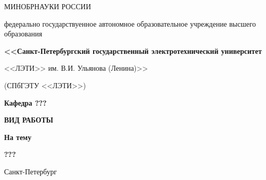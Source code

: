 \documentclass[../main.tex]{subfiles}
\begin{document}
\begin{titlepage}
    \centering

    МИНОБРНАУКИ РОССИИ

    федерально государствуенное автономное образовательное учреждение высшего образования

    {\bfseries\small
        <<Санкт-Петербургский государственный электротехнический университет

        <<ЛЭТИ>> им. В.И. Ульянова (Ленина)>>

        (СПбГЭТУ <<ЛЭТИ>>)
    }

    \vspace{1cm}

    \textbf{Кафедра ???}

    \vfill

    \MakeUppercase{\bfseries\Large
        Вид работы
    }

    {\bfseries
        На тему
    }

    {\bfseries
        ???
    }

    \vfill

    \hfill
     

    \vspace{5mm}

    \hfill
     

    \vspace{3cm}

    Санкт-Петербург\\
    \the\year

\end{titlepage}

\setcounter{page}{2}
\end{document}
